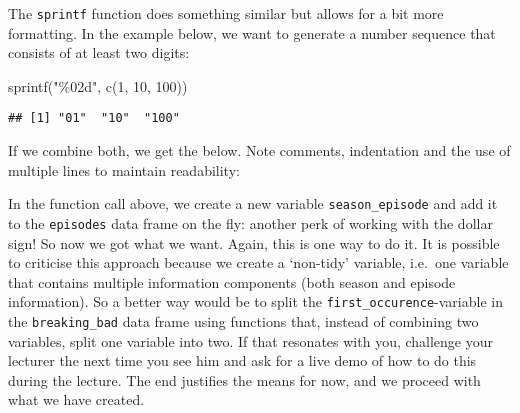\documentclass[
]{article}
\newenvironment{Shaded}{\begin{snugshade}}{\end{snugshade}}
\newcommand{\AttributeTok}[1]{\textcolor[rgb]{0.77,0.63,0.00}{#1}}
\newcommand{\CommentTok}[1]{\textcolor[rgb]{0.56,0.35,0.01}{\textit{#1}}}
\newcommand{\DecValTok}[1]{\textcolor[rgb]{0.00,0.00,0.81}{#1}}
\newcommand{\FunctionTok}[1]{\textcolor[rgb]{0.00,0.00,0.00}{#1}}
\newcommand{\NormalTok}[1]{#1}
\newcommand{\OtherTok}[1]{\textcolor[rgb]{0.56,0.35,0.01}{#1}}
\newcommand{\SpecialCharTok}[1]{\textcolor[rgb]{0.00,0.00,0.00}{#1}}
\newcommand{\StringTok}[1]{\textcolor[rgb]{0.31,0.60,0.02}{#1}}
\begin{document}
The \texttt{sprintf} function does something similar but allows for a
bit more formatting. In the example below, we want to generate a number
sequence that consists of at least two digits:

\begin{Shaded}
\begin{Highlighting}[]
\FunctionTok{sprintf}\NormalTok{(}\StringTok{"\%02d"}\NormalTok{, }\FunctionTok{c}\NormalTok{(}\DecValTok{1}\NormalTok{, }\DecValTok{10}\NormalTok{, }\DecValTok{100}\NormalTok{))}
\end{Highlighting}
\end{Shaded}

\begin{verbatim}
## [1] "01"  "10"  "100"
\end{verbatim}

If we combine both, we get the below. Note comments, indentation and the
use of multiple lines to maintain readability:

\begin{Shaded}
\end{Shaded}

In the function call above, we create a new variable
\texttt{season\_episode} and add it to the \texttt{episodes} data frame
on the fly: another perk of working with the dollar sign! So now we got
what we want. Again, this is one way to do it. It is possible to
criticise this approach because we create a `non-tidy' variable,
i.e.~one variable that contains multiple information components (both
season and episode information). So a better way would be to split the
\texttt{first\_occurence}-variable in the \texttt{breaking\_bad} data
frame using functions that, instead of combining two variables, split
one variable into two. If that resonates with you, challenge your
lecturer the next time you see him and ask for a live demo of how to do
this during the lecture. The end justifies the means for now, and we
proceed with what we have created.
\end{document}
